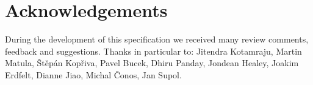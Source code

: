 \section{Acknowledgements}
\label{acks}

During the development of this specification we received many review comments, feedback and suggestions. Thanks in particular to: Jitendra Kotamraju, Martin Matula, \v{S}t\v{e}p\'an Kop\v{r}iva, Pavel Bucek, Dhiru Panday, Jondean Healey, Joakim Erdfelt, Dianne Jiao, Michal \v{C}onos, Jan Supol.
